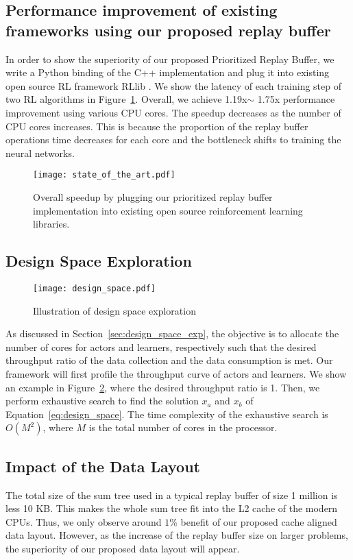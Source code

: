 \subsection{Performance improvement of existing frameworks using our proposed replay buffer}\label{sec:comp_existing}
In order to show the superiority of our proposed Prioritized Replay Buffer, we write a Python binding of the C++ implementation and plug it into existing open source RL framework RLlib \cite{ray_rllib}. We show the latency of each training step of two RL algorithms in Figure~\ref{fig:library_perf}. 
Overall, we achieve 1.19x$\sim$ 1.75x performance improvement using various CPU cores.
The speedup decreases as the number of CPU cores increases. This is because the proportion of the replay buffer operations time decreases for each core and the bottleneck shifts to training the neural networks.

\begin{figure}
    \centering
    \texttt{[image: state\_of\_the\_art.pdf]}
    \caption{Overall speedup by plugging our prioritized replay buffer implementation into existing open source reinforcement learning libraries.}
    \label{fig:library_perf}
\end{figure}


\subsection{Design Space Exploration}

\begin{figure}
    \centering
    \texttt{[image: design\_space.pdf]}
    \caption{Illustration of design space exploration}
    \label{fig:design_space}
\end{figure}

As discussed in Section~\ref{sec:design_space_exp}, the objective is to allocate the number of cores for actors and learners, respectively such that the desired throughput ratio of the data collection and the data consumption is met. Our framework will first profile the throughput curve of actors and learners. We show an example in Figure~\ref{fig:design_space}, where the desired throughput ratio is 1. Then, we perform exhaustive search to find the solution $x_a$ and $x_b$ of Equation~\ref{eq:design_space}. The time complexity of the exhaustive search is $O(M^2)$, where $M$ is the total number of cores in the processor.

\subsection{Impact of the Data Layout}
The total size of the sum tree used in a typical replay buffer of size 1 million is less 10 KB. This makes the whole sum tree fit into the L2 cache of the modern CPUs. Thus, we only observe around $1\%$ benefit of our proposed cache aligned data layout. However, as the increase of the replay buffer size on larger problems, the superiority of our proposed data layout will appear.

